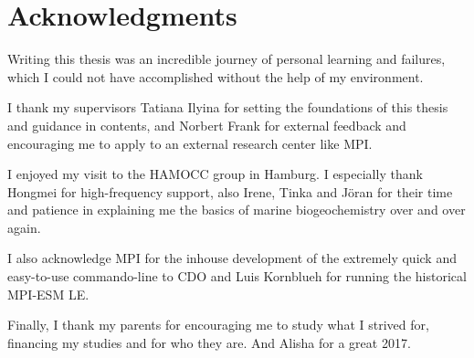 

\chapter*{Acknowledgments}

Writing this thesis was an incredible journey of personal learning and failures, which I could not have accomplished without the help of my environment.\newline

I thank my supervisors Tatiana Ilyina for setting the foundations of this thesis and guidance in contents, and Norbert Frank for external feedback and encouraging me to apply to an external research center like \acf{MPI}.\newline

I enjoyed my visit to the \acs{HAMOCC} group in Hamburg. I especially thank Hongmei for high-frequency support, also Irene, Tinka and J{\"o}ran for their time and patience in explaining me the basics of marine biogeochemistry over and over again.

I also acknowledge \acs{MPI} for the inhouse development of the extremely quick and easy-to-use commando-line to CDO \citep{CDO} and Luis Kornblueh for running the historical \acf{MPI-ESM LE}.\newline

Finally, I thank my parents for encouraging me to study what I strived for, financing my studies and for who they are. And Alisha for a great 2017.